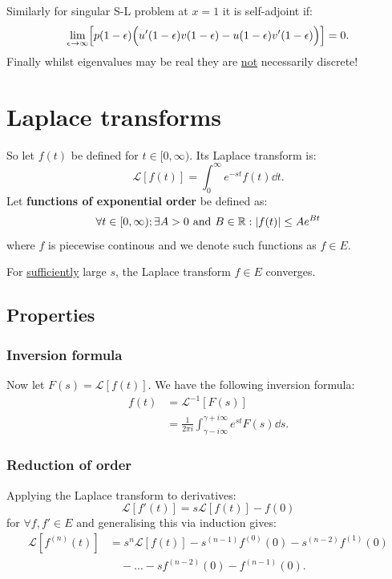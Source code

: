 \documentclass{article}
\begin{document}
Similarly for singular S-L problem at $x=1$ it is self-adjoint if:
$$\lim_{\epsilon\rightarrow\infty}
\Bigl[p(1-\epsilon)
\Bigl(u'(1-\epsilon)v(1-\epsilon)-u(1-\epsilon)v'(1-\epsilon)\Bigr)\Bigr]=0.$$
Finally whilst eigenvalues may be real they are \underline{not}
necessarily discrete!

\newpage

\section{Laplace transforms}
So let $f(t)$ be defined for $t\in[0,\infty)$. Its Laplace transform is:
$$\mathcal{L}[f(t)]=\int_{0}^{\infty}e^{-st}f(t)\dd t.$$
Let \textbf{functions of exponential order} be defined as:
$$\forall t\in[0,\infty);\exists A>0\hspace{0.05in}\text{and}\hspace{0.05in}
B\in\mathbb{R}:|f(t)|\leq Ae^{Bt}$$
where $f$ is piecewise continous and
we denote such functions as $f\in E$.

For \underline{sufficiently} large $s$, the Laplace transform
$f\in E$ converges.

\subsection{Properties}
\subsubsection{Inversion formula}
Now let $F(s)=\mathcal{L}[f(t)]$. We have
the following inversion formula:
\begin{align*}
    f(t)
    &=\mathcal{L}^{-1}[F(s)] \\
    &=\frac{1}{2\pi i}\int_{\gamma-i\infty}^
    {\gamma+i\infty}e^{st}F(s)\dd s.
\end{align*}

\subsubsection{Reduction of order}
Applying the Laplace transform to derivatives:
$$\mathcal{L}[f'(t)]=s\mathcal{L}[f(t)]-f(0)$$
for $\forall f,f'\in E$ and 
generalising this via induction gives:
\begin{align*}
    \mathcal{L}[f^{(n)}(t)]
    &=s^n\mathcal{L}[f(t)]
    -s^{(n-1)}f^{(0)}(0)-s^{(n-2)}f^{(1)}(0) \\
    &\quad-\dots-sf^{(n-2)}(0)-f^{(n-1)}(0).
\end{align*}
\end{document}
